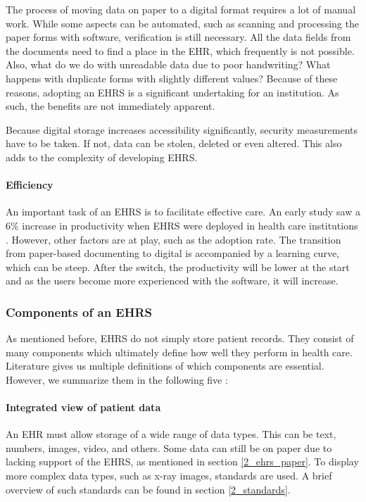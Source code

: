         The process of moving data on paper to a digital format requires a lot of manual work. While some aspects can be automated, such as scanning and processing the paper forms with software, verification is still necessary. All the data fields from the documents need to find a place in the EHR, which frequently is not possible. Also, what do we do with unreadable data due to poor handwriting? What happens with duplicate forms with slightly different values? Because of these reasons, adopting an EHRS is a significant undertaking for an institution. As such, the benefits are not immediately apparent.

        Because digital storage increases accessibility significantly, security measurements have to be taken. If not, data can be stolen, deleted or even altered. This also adds to the complexity of developing EHRS.

        \paragraph{Efficiency} An important task of an EHRS is to facilitate effective care. An early study saw a 6\% increase in productivity when EHRS were deployed in health care institutions \cite{ehrs_efficiency}. However, other factors are at play, such as the adoption rate. The transition from paper-based documenting to digital is accompanied by a learning curve, which can be steep. After the switch, the productivity will be lower at the start and as the users become more experienced with the software, it will increase.

        \subsubsection{Components of an EHRS}

        As mentioned before, EHRS do not simply store patient records. They consist of many components which ultimately define how well they perform in health care. Literature gives us multiple definitions of which components are essential. However, we summarize them in the following five \cite{biomedical_informatics}:

        \paragraph{Integrated view of patient data} An EHR must allow storage of a wide range of data types. This can be text, numbers, images, video, and others. Some data can still be on paper due to lacking support of the EHRS, as mentioned in section \ref{2_ehrs_paper}. To display more complex data types, such as x-ray images, standards are used. A brief overview of such standards can be found in section \ref{2_standards}.


